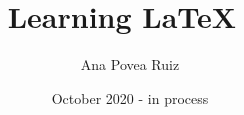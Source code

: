 \documentclass[a4paper,12pt]{article}
\title{Learning \LaTeX\ }
\author{Ana Povea Ruiz }%
\date{October 2020 - in process}
\begin{document}
\newpage

\begin{titlepage}
\maketitle
\end{titlepage}

\newpage
\tableofcontents
\newpage





\end{document}
